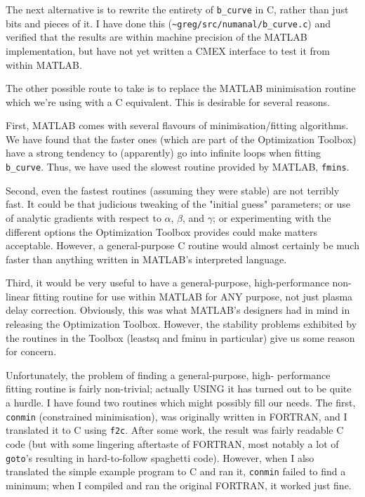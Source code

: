 The next alternative is to rewrite the entirety of \verb|b_curve| in
C, rather than just bits and pieces of it.  I have done this
(\verb|~greg/src/numanal/b_curve.c|) and verified that the results are
within machine precision of the MATLAB implementation, but have not
yet written a CMEX interface to test it from within MATLAB.

The other possible route to take is to replace the MATLAB minimisation
routine which we're using with a C equivalent.  This is desirable for
several reasons.

First, MATLAB comes with several flavours of minimisation/fitting
algorithms.  We have found that the faster ones (which are part of the
Optimization Toolbox) have a strong tendency to (apparently) go into
infinite loops when fitting \verb|b_curve|.  Thus, we have used the
slowest routine provided by MATLAB, \verb|fmins|.

Second, even the fastest routines (assuming they were stable) are not
terribly fast.  It could be that judicious tweaking of the "initial
guess" parameters; or use of analytic gradients with respect to
$\alpha$, $\beta$, and $\gamma$; or experimenting with the different
options the Optimization Toolbox provides could make matters
acceptable.  However, a general-purpose C routine would almost
certainly be much faster than anything written in MATLAB's interpreted
language.

Third, it would be very useful to have a general-purpose,
high-performance non-linear fitting routine for use within MATLAB for
ANY purpose, not just plasma delay correction.  Obviously, this was
what MATLAB's designers had in mind in releasing the Optimization
Toolbox.  However, the stability problems exhibited by the routines in
the Toolbox (leastsq and fminu in particular) give us some reason for
concern.

Unfortunately, the problem of finding a general-purpose, high-
performance fitting routine is fairly non-trivial; actually USING it
has turned out to be quite a hurdle.  I have found two routines which
might possibly fill our needs.  The first, \verb|conmin| (constrained
minimisation), was originally written in FORTRAN, and I translated it
to C using \verb|f2c|.  After some work, the result was fairly
readable C code (but with some lingering aftertaste of FORTRAN, most
notably a lot of \verb|goto|'s resulting in hard-to-follow spaghetti
code).  However, when I also translated the simple example program to
C and ran it, \verb|conmin| failed to find a minimum; when I compiled
and ran the original FORTRAN, it worked just fine.

